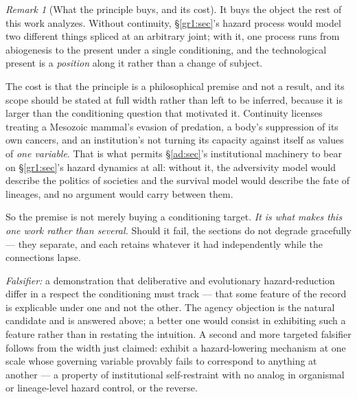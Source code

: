 \documentclass[11pt]{article}
\numberwithin{equation}{section}
\theoremstyle{plain}
\theoremstyle{definition}
\theoremstyle{remark}
\newtheorem{remark}[theorem]{Remark}
\begin{document}
\begin{remark}[What the principle buys, and its cost]
\label{gc:rem:continuitycost}
It buys the object the rest of this work analyzes. Without continuity,
\S\ref{gr1:sec}'s hazard process would model two different things
spliced at an arbitrary joint; with it, one process runs from
abiogenesis to the present under a single conditioning, and the
technological present is a \emph{position} along it rather than a change
of subject.

The cost is that the principle is a philosophical premise and not a
result, and its scope should be stated at full width rather than left to
be inferred, because it is larger than the conditioning question that
motivated it. Continuity licenses treating a Mesozoic mammal's evasion
of predation, a body's suppression of its own cancers, and an
institution's not turning its capacity against itself as values of
\emph{one variable}. That is what permits \S\ref{ad:sec}'s institutional
machinery to bear on \S\ref{gr1:sec}'s hazard dynamics at all: without
it, the adversivity model would describe the politics of societies and
the survival model would describe the fate of lineages, and no argument
would carry between them.

So the premise is not merely buying a conditioning target. \emph{It is
what makes this one work rather than several.} Should it fail, the
sections do not degrade gracefully --- they separate, and each retains
whatever it had independently while the connections lapse.

\emph{Falsifier:} a demonstration that deliberative and evolutionary
hazard-reduction differ in a respect the conditioning must track ---
that some feature of the record is explicable under one and not the
other. The agency objection is the natural candidate and is answered
above; a better one would consist in exhibiting such a feature rather
than in restating the intuition. A second and more targeted falsifier
follows from the width just claimed: exhibit a hazard-lowering mechanism
at one scale whose governing variable provably fails to correspond to
anything at another --- a property of institutional self-restraint with
no analog in organismal or lineage-level hazard control, or the
reverse.
\end{remark}
\end{document}
